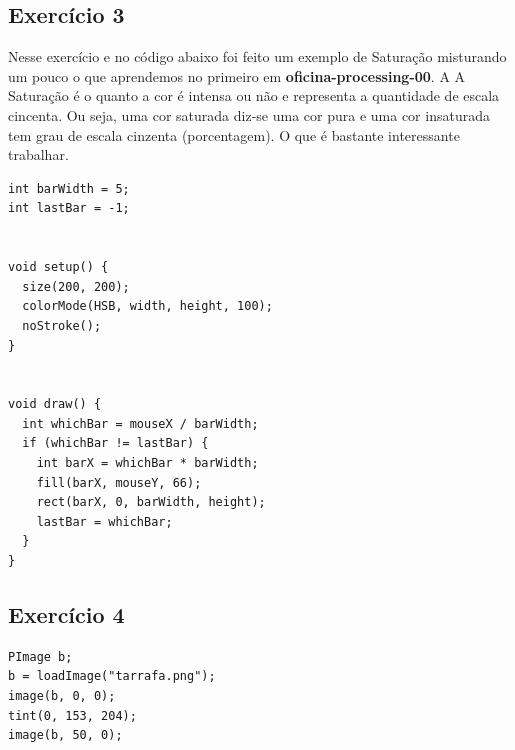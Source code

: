 \documentclass[12pt]{article}
\begin{document}
\subsection{Exercício 3}

\qquad Nesse exercício e no código abaixo foi feito um exemplo de Saturação misturando um pouco o que aprendemos no primeiro em \textbf{oficina-processing-00}. A A Saturação é o quanto a cor é intensa ou não e representa a quantidade de escala cincenta. Ou seja, uma cor saturada diz-se uma cor pura e uma cor insaturada tem grau de escala cinzenta (porcentagem). O que é bastante interessante trabalhar.

\begin{verbatim}
int barWidth = 5;
int lastBar = -1;


void setup() {
  size(200, 200);
  colorMode(HSB, width, height, 100); 
  noStroke();
}


void draw() {
  int whichBar = mouseX / barWidth;
  if (whichBar != lastBar) {
    int barX = whichBar * barWidth;
    fill(barX, mouseY, 66);
    rect(barX, 0, barWidth, height);
    lastBar = whichBar;
  }
}
\end{verbatim}

\subsection{Exercício 4}

\begin{verbatim}
PImage b; 
b = loadImage("tarrafa.png"); 
image(b, 0, 0); 
tint(0, 153, 204); 
image(b, 50, 0);
\end{verbatim}
\end{document}
